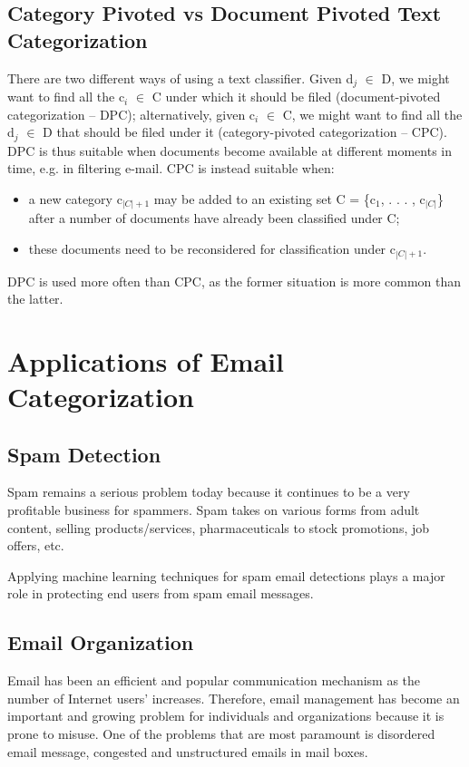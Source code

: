 \subsection{Category Pivoted vs Document Pivoted Text Categorization}
There are two different ways of using a text classifier. Given d$_{j}$ $\in$ D, 
we might want to find all the c$_{i}$ $\in$ C under which it should be filed 
(document-pivoted categorization – DPC); alternatively, given c$_{i}$ $\in$ C, 
we might want to find all the d$_{j}$ $\in$ D that should be filed under it 
(category-pivoted categorization – CPC). DPC is thus suitable when documents 
become available at different moments in time, e.g. in filtering e-mail. CPC 
is instead suitable when: 
\begin{itemize}
  \item a new category c$_{|C|+1}$ may be added to an existing set 
  C = \{c$_{1}$, . . . , c$_{|C|}$\} after a number of documents have 
  already been classified under C;
  \item these documents need to be reconsidered for classification under c$_{|C|+1}$.
\end{itemize}
DPC is used more often than CPC, as the former situation is more common than 
the latter. \cite{Sebastiani2002}

\section{Applications of Email Categorization}
\label{sec:app_email_categ}

\subsection{Spam Detection}
Spam remains a serious problem today because it continues to be a very 
profitable business for spammers. Spam takes on various forms from adult 
content, selling products/services, pharmaceuticals to stock promotions, 
job offers, etc.

Applying machine learning techniques for spam email detections plays a major 
role in protecting end users from spam email messages.\cite{peifeng2007}

\subsection{Email Organization}
Email has been an efficient and popular communication mechanism as the 
number of Internet users’ increases. Therefore, email management has 
become an important and growing problem for individuals and organizations 
because it is prone to misuse. One of the problems that are most paramount 
is disordered email message, congested and unstructured emails in mail 
boxes.


